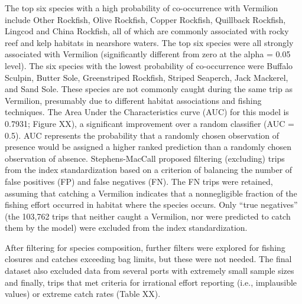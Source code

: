 \documentclass[11pt,
  english,
  a4paper,
]{article}
\begin{document}
\leavevmode\tagmcend\tagstructend\par


The top six species with a high probability of co-occurrence with Vermilion include Other Rockfish, Olive Rockfish, Copper Rockfish, Quillback Rockfish, Lingcod and China Rockfish, all of which are commonly associated with rocky reef and kelp habitats in nearshore waters. The top six species were all strongly associated with Vermilion (significantly different from zero at the alpha = 0.05 level). The six species with the lowest probability of co-occurrence were Buffalo Sculpin, Butter Sole, Greenstriped Rockfish, Striped Seaperch, Jack Mackerel, and Sand Sole. These species are not commonly caught during the same trip as Vermilion, presumably due to different habitat associations and fishing techniques. The Area Under the Characteristics curve (AUC) for this model is 0.7931; Figure XX), a significant improvement over a random classifier (AUC = 0.5). AUC represents the probability that a randomly chosen observation of presence would be assigned a higher ranked prediction than a randomly chosen observation of absence. Stephens-MacCall proposed filtering (excluding) trips from the index standardization based on a criterion of balancing the number of false positives (FP) and false negatives (FN). The FN trips were retained, assuming that catching a Vermilion indicates that a nonnegligible fraction of the fishing effort occurred in habitat where the species occurs. Only ``true negatives'' (the 103,762 trips that neither caught a Vermilion, nor were predicted to catch them by the model) were excluded from the index standardization.

\leavevmode\tagmcend\tagstructend\par


After filtering for species composition, further filters were explored for fishing closures and catches exceeding bag limits, but these were not needed. The final dataset also excluded data from several ports with extremely small sample sizes and finally, trips that met criteria for irrational effort reporting (i.e., implausible values) or extreme catch rates (Table XX).

\leavevmode\tagmcend\tagstructend\par

\end{document}
